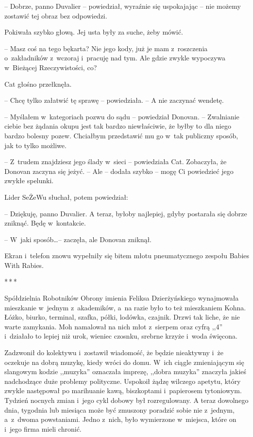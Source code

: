 \documentclass[oneside,polish,11pt,sfheadings]{mwbk}
\newcommand{\threeast}{\bigskip\par\centerline{*\,*\,*}\medskip\par}%
\begin{document}
-- Dobrze, panno Duvalier -- powiedział, wyraźnie się uspokajając -- nie
możemy zostawić tej obraz bez odpowiedzi.

Pokiwała szybko głową. Jej usta były za suche, żeby mówić.

-- Masz coś na tego bękarta? Nie jego kody, już je mam z~roszczenia o~zakładników z~wczoraj i~pracuję nad tym. Ale gdzie zwykle wypoczywa w~Bieżącej Rzeczywistości, co?

Cat głośno przełknęła. 

-- Chcę tylko załatwić tę sprawę -- powiedziała. -- A nie zaczynać wendetę.

-- Myślałem w~kategoriach pozwu do sądu -- powiedział Donovan. -- Zwalnianie ciebie bez żądania okupu jest tak bardzo niewłaściwie, że
byłby to dla niego bardzo bolesny pozew. Chciałbym przedstawić mu go w~tak publiczny sposób, jak to tylko możliwe.

-- Z~trudem znajdziesz jego ślady w~sieci -- powiedziała Cat. Zobaczyła,
że Donovan zaczyna się jeżyć. -- Ale -- dodała szybko -- mogę Ci powiedzieć
jego zwykłe spelunki.

Lider SeŻeWu słuchał, potem powiedział: 

-- Dziękuję, panno Duvalier. A
teraz, byłoby najlepiej, gdyby postarała się dobrze zniknąć. Będę w~kontakcie.

-- W~jaki sposób\ldots -- zaczęła, ale Donovan zniknął.

Ekran i~telefon znowu wypełniły się bitem młotu pneumatycznego zespołu
Babies With Rabies.
  \threeast 

Spółdzielnia Robotników Obrony imienia Feliksa Dzierżyńskiego
wynajmowała mieszkanie w~jednym z~akademików, a~na razie było to też
mieszkaniem Kohna. Łóżko, biurko, terminal, szafka, półki, lodówka,
czajnik. Drzwi tak liche, że nie warte zamykania. Moh namalował na nich
młot z~sierpem oraz cyfrą ,,4'' i~działało to lepiej niż urok, wieniec
czosnku, srebrne krzyże i~woda święcona.

Zadzwonił do kolektywu i~zostawił wiadomość, że będzie nieaktywny i~że
oczekuje na dobrą muzykę, kiedy wróci do domu. W~ich ciągle zmieniającym
się slangowym kodzie ,,muzyka'' oznaczała imprezę, ,,dobra muzyka'' znaczyła
jakieś nadchodzące duże problemy polityczne. Uspokoił żądzę wilczego
apetytu, który zwykle następował po marihuanie kawą, biszkoptami i~papierosem tytoniowym. Tydzień nocnych zmian i~jego cykl dobowy był
rozregulowany. A teraz dowolnego dnia, tygodnia lub miesiąca może być
zmuszony poradzić sobie nie z~jednym, a~z~dwoma powstaniami. Jedno z~nich, było wymierzone w~miejsca, które on i~jego firma mieli chronić.
\end{document}
